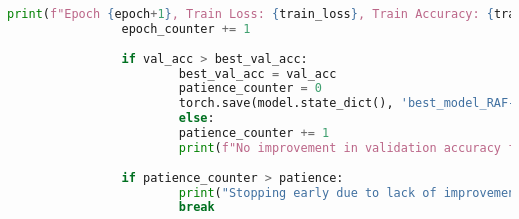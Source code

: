 \begin{lstlisting}[language=Python, caption={Python skript použitý na trenovanie modelu}, label={lst:emotion-recognition}]
                print(f"Epoch {epoch+1}, Train Loss: {train_loss}, Train Accuracy: {train_acc}, Test Loss: {test_loss}, Test Accuracy: {test_acc}, Val Loss: {val_loss}, Val Accuracy: {val_acc}")
                epoch_counter += 1
                
                if val_acc > best_val_acc:
                        best_val_acc = val_acc
                        patience_counter = 0 
                        torch.save(model.state_dict(), 'best_model_RAF-DB_1.pth')
                        else:
                        patience_counter += 1
                        print(f"No improvement in validation accuracy for {patience_counter} epochs.")
                
                if patience_counter > patience:
                        print("Stopping early due to lack of improvement in validation accuracy.")
                        break
\end{lstlisting}